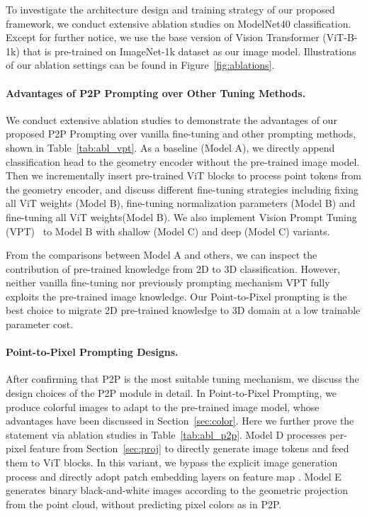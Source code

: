 \documentclass{article}
\begin{document}
To investigate the architecture design and training strategy of our proposed framework, we conduct extensive ablation studies on ModelNet40 classification. Except for further notice, we use the base version of Vision Transformer (ViT-B-1k) that is pre-trained on ImageNet-1k dataset as our image model. Illustrations of our ablation settings can be found in Figure~\ref{fig:ablations}.

\paragraph{Advantages of P2P Prompting over Other Tuning Methods.} We conduct extensive ablation studies to demonstrate the advantages of our proposed P2P Prompting over vanilla fine-tuning and other prompting methods, shown in Table~\ref{tab:abl_vpt}. As a baseline (Model A), we directly append classification head to the geometry encoder without the pre-trained image model. Then we incrementally insert pre-trained ViT blocks to process point tokens from the geometry encoder, and discuss different fine-tuning strategies including fixing all ViT weights (Model B), fine-tuning normalization parameters (Model B) and fine-tuning all ViT weights(Model B). We also implement Vision Prompt Tuning (VPT)~\cite{jia2022vpt} to Model B with shallow (Model C) and deep (Model C) variants.

From the comparisons between Model A and others, we can inspect the contribution of pre-trained knowledge from 2D to 3D classification. However, neither vanilla fine-tuning nor previously prompting mechanism VPT fully exploits the pre-trained image knowledge. Our Point-to-Pixel prompting is the best choice to migrate 2D pre-trained knowledge to 3D domain at a low trainable parameter cost.   

\paragraph{Point-to-Pixel Prompting Designs.}

After confirming that P2P is the most suitable tuning mechanism, we discuss the design choices of the P2P module in detail. In Point-to-Pixel Prompting, we produce colorful images to adapt to the pre-trained image model, whose advantages have been discussed in Section~\ref{sec:color}. Here we further prove the statement via ablation studies in Table~\ref{tab:abl_p2p}. Model D processes per-pixel feature  from Section~\ref{sec:proj} to directly generate image tokens and feed them to ViT blocks. In this variant, we bypass the explicit image generation process and directly adopt patch embedding layers on feature map . Model E generates binary black-and-white images according to the geometric projection from the point cloud, without predicting pixel colors as in P2P.
\end{document}
